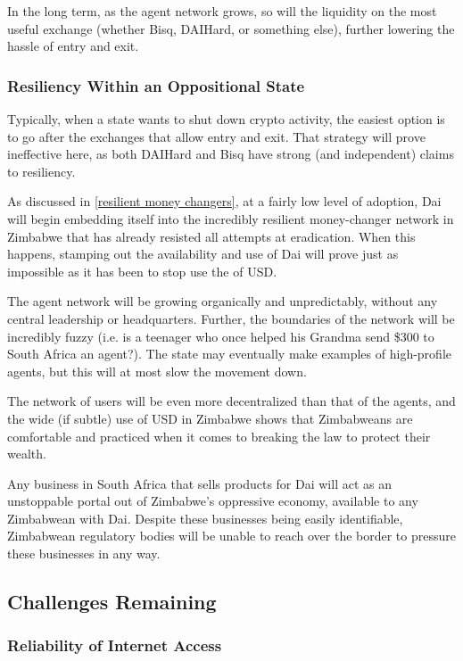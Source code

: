 \documentclass{article}
\begin{document}
In the long term, as the agent network grows, so will the liquidity on the most useful exchange (whether Bisq, DAIHard, or something else), further lowering the hassle of entry and exit.

\subsubsection{Resiliency Within an Oppositional State} \label{state resilient}

Typically, when a state wants to shut down crypto activity, the easiest option is to go after the exchanges that allow entry and exit. That strategy will prove ineffective here, as both DAIHard and Bisq have strong (and independent) claims to resiliency.

As discussed in \ref{resilient money changers}, at a fairly low level of adoption, Dai will begin embedding itself into the incredibly resilient money-changer network in Zimbabwe that has already resisted all attempts at eradication. When this happens, stamping out the availability and use of Dai will prove just as impossible as it has been to stop use the of USD.

The agent network will be growing organically and unpredictably, without any central leadership or headquarters. Further, the boundaries of the network will be incredibly fuzzy (i.e. is a teenager who once helped his Grandma send \$300 to South Africa an agent?). The state may eventually make examples of high-profile agents, but this will at most slow the movement down.

The network of users will be even more decentralized than that of the agents, and the wide (if subtle) use of USD in Zimbabwe shows that Zimbabweans are comfortable and practiced when it comes to breaking the law to protect their wealth.

Any business in South Africa that sells products for Dai will act as an unstoppable portal out of Zimbabwe's oppressive economy, available to any Zimbabwean with Dai. Despite these businesses being easily identifiable, Zimbabwean regulatory bodies will be unable to reach over the border to pressure these businesses in any way.

\subsection{Challenges Remaining} \label{challenges remaining}

\subsubsection{Reliability of Internet Access} \label{reliable internet access}
\end{document}

